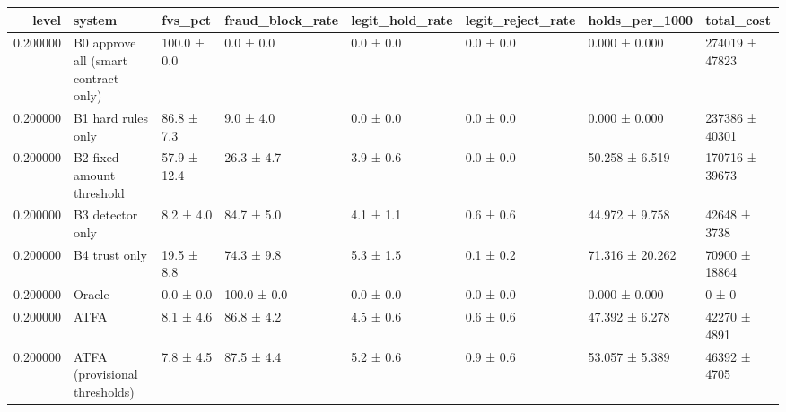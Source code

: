 \begin{tabular}{rlllllll}
\toprule
level & system & fvs\_pct & fraud\_block\_rate & legit\_hold\_rate & legit\_reject\_rate & holds\_per\_1000 & total\_cost \\
\midrule
0.200000 & B0 approve all (smart contract only) & 100.0 ± 0.0 & 0.0 ± 0.0 & 0.0 ± 0.0 & 0.0 ± 0.0 & 0.000 ± 0.000 & 274019 ± 47823 \\
0.200000 & B1 hard rules only & 86.8 ± 7.3 & 9.0 ± 4.0 & 0.0 ± 0.0 & 0.0 ± 0.0 & 0.000 ± 0.000 & 237386 ± 40301 \\
0.200000 & B2 fixed amount threshold & 57.9 ± 12.4 & 26.3 ± 4.7 & 3.9 ± 0.6 & 0.0 ± 0.0 & 50.258 ± 6.519 & 170716 ± 39673 \\
0.200000 & B3 detector only & 8.2 ± 4.0 & 84.7 ± 5.0 & 4.1 ± 1.1 & 0.6 ± 0.6 & 44.972 ± 9.758 & 42648 ± 3738 \\
0.200000 & B4 trust only & 19.5 ± 8.8 & 74.3 ± 9.8 & 5.3 ± 1.5 & 0.1 ± 0.2 & 71.316 ± 20.262 & 70900 ± 18864 \\
0.200000 & Oracle & 0.0 ± 0.0 & 100.0 ± 0.0 & 0.0 ± 0.0 & 0.0 ± 0.0 & 0.000 ± 0.000 & 0 ± 0 \\
0.200000 & ATFA & 8.1 ± 4.6 & 86.8 ± 4.2 & 4.5 ± 0.6 & 0.6 ± 0.6 & 47.392 ± 6.278 & 42270 ± 4891 \\
0.200000 & ATFA (provisional thresholds) & 7.8 ± 4.5 & 87.5 ± 4.4 & 5.2 ± 0.6 & 0.9 ± 0.6 & 53.057 ± 5.389 & 46392 ± 4705 \\
\bottomrule
\end{tabular}

